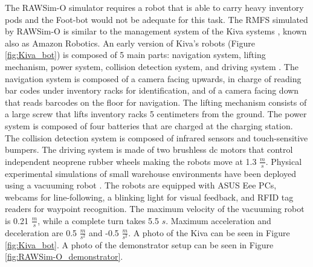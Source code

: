 \documentclass[../../Thesis.tex]{subfiles}
\begin{document}
			The RAWSim-O simulator requires a robot that is able to carry heavy inventory pods and the Foot-bot would not be adequate for this task. The RMFS simulated by RAWSim-O is similar to the management system of the Kiva systems \cite{Enright2011}, known also as Amazon Robotics.  An early version of Kiva's robots (Figure \ref{fig:Kiva_bot}) is composed of 5 main parts: navigation system, lifting mechanism, power system, collision detection system, and driving system \cite{Guizzo2008}. The navigation system is composed of a camera facing upwards, in charge of reading bar codes under inventory racks for identification, and of a camera facing down that reads barcodes on the floor for navigation. The lifting mechanism consists of a large screw that lifts inventory racks 5 centimeters from the ground. The power system is composed of four batteries that are charged at the charging station. The collision detection system is composed of infrared sensors and touch-sensitive bumpers. The driving system is made of two brushless dc motors that control independent neoprene rubber wheels making the robots move at 1.3 $\frac{m}{s}$. Physical experimental simulations of small warehouse environments have been deployed using a vacuuming robot \cite{IRobot}.  The robots are equipped with ASUS Eee PCs, webcams for line-following, a blinking light for visual feedback, and RFID tag readers for waypoint recognition. The maximum velocity of the vacuuming robot is 0.21 $\frac{m}{s}$, while a complete turn takes 5.5 $s$. Maximum acceleration and deceleration are 0.5 $\frac{m}{s^2}$ and -0.5 $\frac{m}{s^2}$. A photo of the Kiva can be seen in Figure \ref{fig:Kiva_bot}. A photo of the demonstrator setup can be seen in Figure \ref{fig:RAWSim-O_demonstrator}.
			
\end{document}
